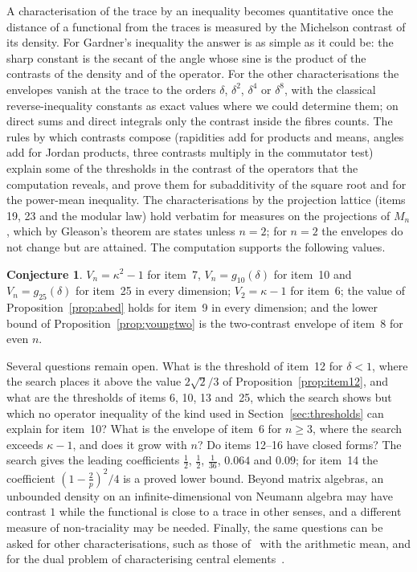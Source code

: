 \documentclass[11pt]{article}
\theoremstyle{plain}
\theoremstyle{definition}
\newtheorem{conjecture}[theorem]{Conjecture}
\theoremstyle{remark}
\begin{document}
A characterisation of the trace by an inequality becomes quantitative once the distance of a functional from the
traces is measured by the Michelson contrast of its density. For Gardner's inequality the answer is as simple as it could
be: the sharp constant is the secant of the angle whose sine is the product of the contrasts of the density and of the
operator. For the other characterisations the envelopes vanish at the trace to the orders $\delta$, $\delta^2$, $\delta^4$
or $\delta^8$, with the classical reverse-inequality constants as exact values where we could determine them; on direct
sums and direct integrals only the contrast inside the fibres counts. The rules by which contrasts compose (rapidities add for products and
means, angles add for Jordan products, three contrasts multiply in the commutator test) explain some of the thresholds in
the contrast of the operators that the computation reveals, and prove them for subadditivity of the square root and for
the power-mean inequality. The characterisations by the projection lattice (items 19, 23 and the modular law) hold
verbatim for measures on the projections of $M_n$, which by Gleason's theorem are states unless $n=2$; for $n=2$ the
envelopes do not change but are attained. The computation supports the following values.

\begin{conjecture}\label{conj:values}
$V_n=\kappa^2-1$ for item~7, $V_n=g_{10}(\delta)$ for item~10 and $V_n=g_{25}(\delta)$ for item~25 in every dimension;
$V_2=\kappa-1$ for item~6; the value of Proposition~\ref{prop:abed} holds for item~9 in every dimension; and the lower
bound of Proposition~\ref{prop:youngtwo} is the two-contrast envelope of item~8 for even $n$.
\end{conjecture}

Several questions remain open. What is the threshold of item~12 for $\delta<1$, where the search places it above
the value $2\sqrt2/3$ of Proposition~\ref{prop:item12}, and what are the thresholds of items 6, 10, 13 and~25, which the search shows but which no operator inequality of the kind used
in Section~\ref{sec:thresholds} can explain for item~10? What is the envelope of item~6 for $n\ge3$, where the search
exceeds $\kappa-1$, and does it grow with $n$? Do items 12--16 have closed forms? The search gives the leading
coefficients $\frac12$, $\frac12$, $\frac1{36}$, $0.064$ and $0.09$; for item~14 the coefficient $(1-\frac2p)^2/4$ is a
proved lower bound. Beyond matrix algebras, an unbounded density on an infinite-dimensional von Neumann algebra may have
contrast $1$ while the functional is close to a trace in other senses, and a different measure of non-traciality may be
needed. Finally, the same questions can be asked for other characterisations, such as those
of~\cite{moslehian2025jmaa,bikchentaev2026sgm} with the arithmetic mean, and for the dual problem of characterising
central elements~\cite{novikov2015}.
\end{document}
